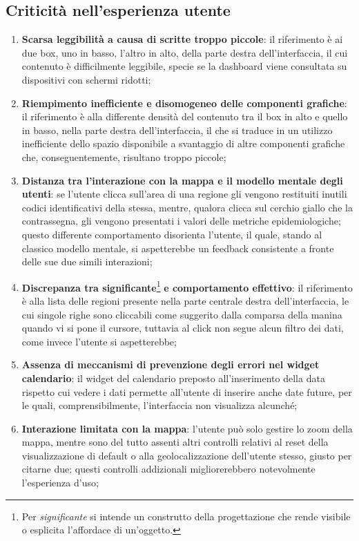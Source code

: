 \documentclass[../../main.tex]{subfiles}
\begin{document}
\subsection{Criticità nell'esperienza utente}\label{ss:criticita}
\begin{enumerate}
    \item \textbf{Scarsa leggibilità a causa di scritte troppo piccole}: il riferimento è ai due box, uno in basso, l'altro in alto, della parte destra dell'interfaccia, il cui contenuto è difficilmente leggibile, specie se la dashboard viene consultata su dispositivi con schermi ridotti; \label{el:1}
    \item \textbf{Riempimento inefficiente e disomogeneo delle componenti grafiche}: il riferimento è alla differente densità del contenuto tra il box in alto e quello in basso, nella parte destra dell'interfaccia, il che si traduce in un utilizzo inefficiente dello spazio disponibile a svantaggio di altre componenti grafiche che, conseguentemente, risultano troppo piccole;\label{el:2}
    \item \textbf{Distanza tra l'interazione con la mappa e il modello mentale degli utenti}: se l'utente clicca sull'area di una regione gli vengono restituiti inutili codici identificativi della stessa, mentre, qualora clicca sul cerchio giallo che la contrassegna, gli vengono presentati i valori delle metriche epidemiologiche; questo differente comportamento disorienta l'utente, il quale, stando al classico modello mentale, si aspetterebbe un feedback consistente a fronte delle sue due simili interazioni;\label{el:3}
    \item \textbf{Discrepanza tra significante}\footnote{Per \textit{significante} si intende un construtto della progettazione che rende visibile o esplicita l'affordace di un'oggetto.}  \textbf{e comportamento effettivo}: il riferimento è alla lista delle regioni presente nella parte centrale destra dell'interfaccia, le cui singole righe sono cliccabili come suggerito dalla comparsa della manina quando vi si pone il cursore, tuttavia al click non segue alcun filtro dei dati, come invece l'utente si aspetterebbe;\label{el:4}
    \item \textbf{Assenza di meccanismi di prevenzione degli errori nel widget calendario}: il widget del calendario preposto all'inserimento della data rispetto cui vedere i dati permette all'utente di inserire anche date future, per le quali, comprensibilmente, l'interfaccia non visualizza alcunché;\label{el:5}
    \item \textbf{Interazione limitata con la mappa}: l'utente può solo gestire lo zoom della mappa, mentre sono del tutto assenti altri controlli relativi al reset della visualizzazione di default o alla geolocalizzazione dell'utente stesso, giusto per citarne due; questi controlli addizionali migliorerebbero notevolmente l'esperienza d'uso;\label{el:6}

\end{enumerate}
\end{document}

